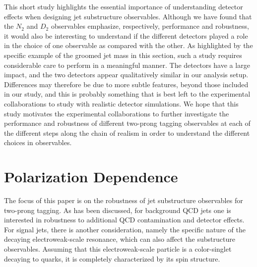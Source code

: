 \documentclass[11pt]{cernrep}
\begin{document}
This short study highlights the essential importance of understanding detector effects when designing jet substructure observables.
%
Although we have found that the $N_2$ and $D_2$ observables emphasize, respectively, performance and robustness, it would also be interesting to understand if the different detectors played a role in the choice of one observable as compared with the other.
%
As highlighted by the specific example of the groomed jet mass in this section, such a study requires considerable care to perform in a meaningful manner.
%
The detectors have a large impact, and the two detectors appear qualitatively similar in our analysis setup.
%
Differences may therefore be due to more subtle features, beyond those included in our study, and this is probably something that is best left to the experimental collaborations to study with realistic detector simulations.
%
We hope that this study motivates the experimental collaborations to further investigate the performance and robustness of different two-prong tagging observables at each of the different steps along the chain of realism in order to understand the different choices in observables.



\section{Polarization Dependence}\label{jetsub_2prong_sec:polar}

The focus of this paper is on the robustness of jet substructure
observables for two-prong tagging.
%
As has been discussed, for
background QCD jets one is interested in robustness to additional QCD
contamination and detector effects.
%
For signal jets, there is another consideration, namely the specific nature of the decaying electroweak-scale resonance, which can also affect the substructure observables.
%
Assuming that this electroweak-scale particle is a color-singlet decaying to quarks, it is completely
characterized by its spin structure.
\end{document}
